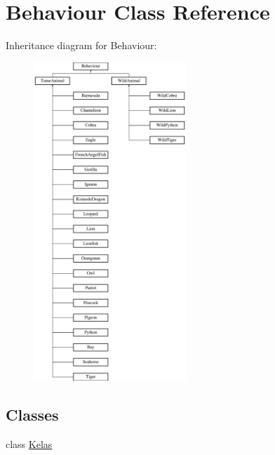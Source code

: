 \hypertarget{classBehaviour}{\section{Behaviour Class Reference}
\label{classBehaviour}
}
Inheritance diagram for Behaviour\+:\begin{figure}[H]
\begin{center}
\leavevmode
\includegraphics[height=12.000000cm]{classBehaviour}
\end{center}
\end{figure}
\subsection*{Classes}
\begin{DoxyCompactItemize}
\item 
class \hyperlink{classBehaviour_1_1Kelas}{Kelas}
\end{DoxyCompactItemize}
